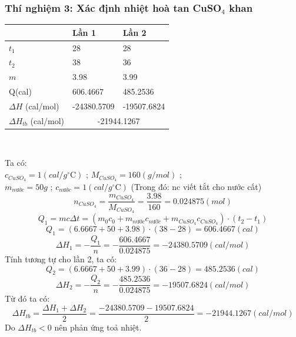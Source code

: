 \documentclass[12pt]{article}
\begin{document}
\subsubsection{Thí nghiệm 3: Xác định nhiệt hoà tan CuSO$_4$ khan}
{\centering \begin{tabular}{|m{3cm}|m{3cm}|m{3cm}|}
\hline
  & Lần 1 & Lần 2 \\ \hline
$t_1$ & 28 & 28 \\ \hline
$t_2$& 38 & 36 \\ \hline
$m$ & 3.98 & 3.99\\ \hline
Q(cal) & 606.4667 & 485.2536\\ \hline
$\Delta H$ (cal/mol) & -24380.5709 & -19507.6824 \\ \hline
$\Delta H_{tb}$ (cal/mol) & \multicolumn{2}{c|}{-21944.1267} \\ \hline
\end{tabular}\\  } 
Ta có: \\
$c_{CuSO_4} = 1 (cal/g^\circ\mathrm{C})$ ;
$M_{CuSO_4} = 160(g/mol)$ ;\\
$m_{nước} = 50g$ ;
$c_{nước} = 1 (cal/g^\circ\mathrm{C}) $ (Trong đó: nc viết tắt cho nước cất)
\[
n_{CuSO_4} = \frac{m_{CuSO_4}}{M_{CuSO_4}} = \frac{3.98}{160}= 0.024875 (mol)
\]
\[
Q_1 = mc \Delta t = ( m_0c_0 + m_{nước}c_{nước} + m_{CuSO_4}c_{CuSO_4}) \cdot (t_2 - t_1)
\]
\[
Q_1 = (6.6667 + 50 + 3.98) \cdot (38-28) = 606.4667 (cal)
\]
\[
\Delta H_1 = - \frac{Q_1}{n} = - \frac{606.4667}{0.024875} = -24380.5709 (cal/mol)
\]
Tính tương tự cho lần 2, ta có:
\[
Q_2 = (6.6667 + 50 +3.99) \cdot (36-28) = 485.2536 (cal)
\]
\[
\Delta H_2 = -\frac{Q_2}{n} = -\frac{485.2536}{0.024875} = - 19507.6824 (cal/mol)
\]
Từ đó ta có:
\[
\Delta H_{tb} = \frac{\Delta H_1 + \Delta H_2}{2} = \frac{-24380.5709-19507.6824}{2}= -21944.1267 (cal/mol)
\]
Do $\Delta H_{tb} < 0 $ nên phản ứng toả nhiệt. 
\end{document}

